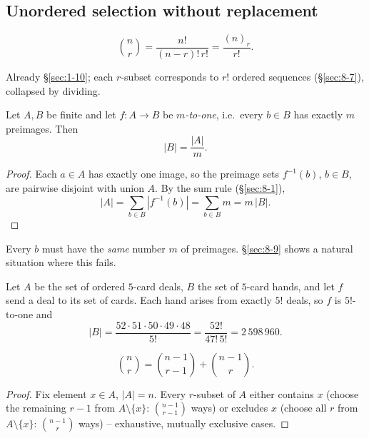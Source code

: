 \subsection{Unordered selection without replacement}
\label{sec:8-8}

\begin{proposition}
\[
\binom{n}{r} = \frac{n!}{(n-r)!\,r!} = \frac{(n)_r}{r!}.
\]
\end{proposition}
\begin{note}
Already \S\ref{sec:1-10}; each $r$-subset corresponds to $r!$ ordered sequences (\S\ref{sec:8-7}), collapsed by dividing.
\end{note}

\bigskip
\begin{theorem}
\label{thm:divisionrule}
Let $A,B$ be finite and let $f:A\to B$ be \emph{$m$-to-one}, i.e.\ every $b\in B$ has exactly $m$ preimages. Then
\[
|B| = \frac{|A|}{m}.
\]
\end{theorem}
\begin{proof}
Each $a\in A$ has exactly one image, so the preimage sets $f^{-1}(b)$, $b\in B$, are pairwise disjoint with union $A$. By the sum rule (\S\ref{sec:8-1}),
\[
|A| = \sum_{b\in B}\left|f^{-1}(b)\right| = \sum_{b\in B} m = m\,|B|.
\]
\end{proof}
\begin{note}
Every $b$ must have the \emph{same} number $m$ of preimages. \S\ref{sec:8-9} shows a natural situation where this fails.
\end{note}

\begin{example}
Let $A$ be the set of ordered $5$-card deals, $B$ the set of $5$-card hands, and let $f$ send a deal to its set of cards. Each hand arises from exactly $5!$ deals, so $f$ is $5!$-to-one and
\[
|B| = \frac{52\cdot51\cdot50\cdot49\cdot48}{5!} = \frac{52!}{47!\,5!} = 2\,598\,960.
\]
\end{example}

\bigskip
\begin{proposition}
\[
\binom{n}{r} = \binom{n-1}{r-1} + \binom{n-1}{r}.
\]
\end{proposition}
\begin{proof}
Fix element $x\in A$, $|A|=n$. Every $r$-subset of $A$ either contains $x$ (choose the remaining $r-1$ from $A\setminus\{x\}$: $\binom{n-1}{r-1}$ ways) or excludes $x$ (choose all $r$ from $A\setminus\{x\}$: $\binom{n-1}{r}$ ways) -- exhaustive, mutually exclusive cases.
\end{proof}

